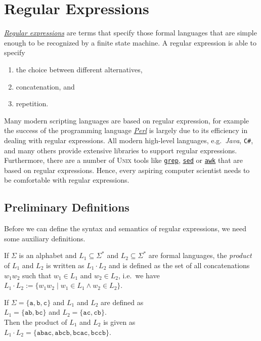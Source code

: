 \chapter{Regular Expressions \label{chapter:regular-expressions}}
\href{http://en.wikipedia.org/wiki/Regular_expression}{\emph{Regular expressions}} are terms that
specify those formal languages that are simple enough to be recognized by a finite state machine.   
A regular expression is able to specify 
\begin{enumerate}
\item the choice between different alternatives,
\item concatenation, and
\item repetition.
\end{enumerate}
Many modern scripting languages are based on regular expression, for example
the success of the programming language \href{http://en.wikipedia.org/wiki/Perl}{\textsl{Perl}} is
largely due to its efficiency in dealing with regular expressions.
All modern high-level languages, e.g.~\textsl{Java}, \texttt{C\#}, and many others
provide extensive libraries to support regular expressions.  Furthermore, there are a number of 
\textsc{Unix} tools like \href{http://en.wikipedia.org/wiki/Grep}{\texttt{grep}}, 
\href{http://en.wikipedia.org/wiki/Sed}{\texttt{sed}} or
\href{http://en.wikipedia.org/wiki/Awk}{\texttt{awk}} that are based on regular expressions.  Hence,
every aspiring computer scientist needs to be comfortable with regular expressions.


\section{Preliminary Definitions}
Before we can define the syntax and semantics of regular expressions, we need some auxiliary definitions. 


\begin{Definition}
  If $\Sigma$ is an  alphabet and $L_1 \subseteq \Sigma^*$ and $L_2 \subseteq \Sigma^*$ are formal
  languages, the \emph{product} of $L_1$ and $L_2$ is written as
  $L_1 \cdot L_2$ and is defined as the set of all concatenations $w_1w_2$ such that $w_1 \in L_1$ and
  $w_2 \in L_2$, i.e.~we have
  \\[0.2cm]
  \hspace*{1.3cm}
  $L_1 \cdot L_2 := \bigl\{ w_1w_2 \mid w_1 \in L_1 \wedge w_2 \in L_2 \bigr\}$. \eox
\end{Definition}

\exampleEng
If $\Sigma = \{ \texttt{a}, \texttt{b}, \texttt{c} \}$ and $L_1$ and $L_2$ are defined as
\\[0.2cm]
\hspace*{1.3cm}
$L_1 = \{ \texttt{ab}, \texttt{bc} \}$ \quad and \quad
$L_2 = \{ \texttt{ac}, \texttt{cb} \}$. 
\\[0.2cm]
Then the product of $L_1$ and $L_2$ is given as
\\[0.2cm]
\hspace*{1.3cm}
$L_1 \cdot L_2 = \{ \texttt{abac}, \texttt{abcb}, \texttt{bcac}, \texttt{bccb} \}$.  \eox

